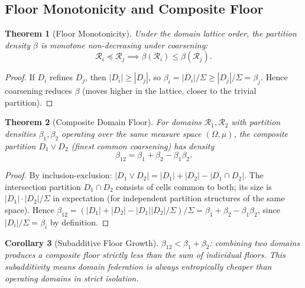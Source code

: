 \documentclass[twocolumn,11pt,a4paper]{article}
\theoremstyle{plain}
\newtheorem{theorem}{Theorem}[section]
\newtheorem{corollary}[theorem]{Corollary}
\theoremstyle{definition}
\theoremstyle{remark}
\newcommand{\abs}[1]{\left|#1\right|}
\begin{document}
\subsection{Floor Monotonicity and Composite Floor}

\begin{theorem}[Floor Monotonicity]
\label{thm:monotone}
Under the domain lattice order, the partition density $\beta$ is monotone non-decreasing under coarsening:
\begin{equation}
  \mathcal{R}_i \preceq \mathcal{R}_j \implies \beta(\mathcal{R}_i) \le \beta(\mathcal{R}_j).
\end{equation}
\end{theorem}

\begin{proof}
If $D_i$ refines $D_j$, then $\abs{D_i} \ge \abs{D_j}$, so $\beta_i = \abs{D_i}/\Sigma \ge \abs{D_j}/\Sigma = \beta_j$.  Hence coarsening reduces $\beta$ (moves higher in the lattice, closer to the trivial partition).
\end{proof}

\begin{theorem}[Composite Domain Floor]
\label{thm:composite_floor}
For domains $\mathcal{R}_1, \mathcal{R}_2$ with partition densities $\beta_1, \beta_2$ operating over the same measure space $(\Omega,\mu)$, the composite partition $D_1 \vee D_2$ (finest common coarsening) has density
\begin{equation}
  \beta_{12} = \beta_1 + \beta_2 - \beta_1\beta_2.
  \label{eq:composite_density}
\end{equation}
\end{theorem}

\begin{proof}
By inclusion-exclusion: $\abs{D_1 \vee D_2} = \abs{D_1} + \abs{D_2} - \abs{D_1 \cap D_2}$.  The intersection partition $D_1 \cap D_2$ consists of cells common to both; its size is $\abs{D_1}\cdot\abs{D_2}/\Sigma$ in expectation (for independent partition structures of the same space).  Hence $\beta_{12} = (\abs{D_1}+\abs{D_2}-\abs{D_1}\abs{D_2}/\Sigma)/\Sigma = \beta_1 + \beta_2 - \beta_1\beta_2$, since $\abs{D_i}/\Sigma = \beta_i$ by definition.
\end{proof}

\begin{corollary}[Subadditive Floor Growth]
\label{cor:subadditive}
$\beta_{12} < \beta_1 + \beta_2$: combining two domains produces a composite floor strictly less than the sum of individual floors.  This subadditivity means domain federation is \emph{always} entropically cheaper than operating domains in strict isolation.
\end{corollary}
\end{document}
